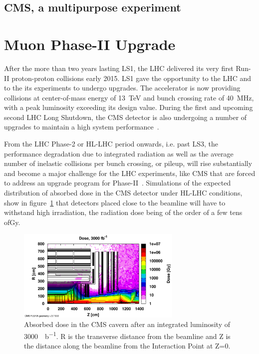 	\subsection{CMS, a multipurpose experiment}
	\label{chapt2:ssec:CMS}

\section{Muon Phase-II Upgrade}
\label{chapt2:sec:phase-2}

After the more than two years lasting LS1, the LHC delivered its very first Run-II proton-proton collisions early 2015. LS1 gave the opportunity to the LHC and to the its experiments to undergo upgrades. The accelerator is now providing collisions at center-of-mass energy of \SI{13}{TeV} and bunch crossing rate of \SI{40}{MHz}, with a peak luminosity exceeding its design value. During the first and upcoming second LHC Long Shutdown, the CMS detector is also undergoing a number of upgrades to maintain a high system performance~\cite{MUONTDR}.

From the LHC Phase-2 or HL-LHC period onwards, i.e. past LS3, the performance degradation due to integrated radiation as well as the average number of inelastic collisions per bunch crossing, or pileup, will rise substantially and become a major challenge for the LHC experiments, like CMS that are forced to address an upgrade program for Phase-II~\cite{PHASEIITP}. Simulations of the expected distribution of absorbed dose in the CMS detector under HL-LHC conditions, show in figure~\ref{fig:Dose} that detectors placed close to the beamline will have to withstand high irradiation, the radiation dose being of the order of a few tens of\si{Gy}.

\begin{figure}[H]
	\centering
	\includegraphics[width=0.7\textwidth]{fig/chapt2/HL-LHC-Dose.png}
	\caption{\label{fig:Dose} Absorbed dose in the CMS cavern after an integrated luminosity of \SI{3000}{\femto\per\barn}. R is the transverse distance from the beamline and Z is the distance along the beamline from the Interaction Point at Z=0.}
\end{figure}

